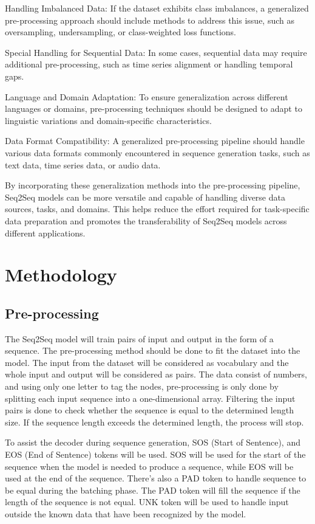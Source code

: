 \documentclass[conference]{IEEEtran}
\begin{document}
    Handling Imbalanced Data: If the dataset exhibits class imbalances, a generalized pre-processing approach should include methods to address this issue, such as oversampling, undersampling, or class-weighted loss functions.

    Special Handling for Sequential Data: In some cases, sequential data may require additional pre-processing, such as time series alignment or handling temporal gaps.

    Language and Domain Adaptation: To ensure generalization across different languages or domains, pre-processing techniques should be designed to adapt to linguistic variations and domain-specific characteristics.

    Data Format Compatibility: A generalized pre-processing pipeline should handle various data formats commonly encountered in sequence generation tasks, such as text data, time series data, or audio data.

By incorporating these generalization methods into the pre-processing pipeline, Seq2Seq models can be more versatile and capable of handling diverse data sources, tasks, and domains. This helps reduce the effort required for task-specific data preparation and promotes the transferability of Seq2Seq models across different applications.


\section{Methodology}

\subsection{Pre-processing}



The Seq2Seq model will train pairs of input and output in the form of a sequence. The pre-processing method should be done to fit the dataset into the model. The input from the dataset will be considered as vocabulary and the whole input and output will be considered as pairs. The data consist of numbers, and using only one letter to tag the nodes, pre-processing is only done by splitting each input sequence into a one-dimensional array. Filtering the input pairs is done to check whether the sequence is equal to the determined length size. If the sequence length exceeds the determined length, the process will stop.

To assist the decoder during sequence generation, SOS (Start of Sentence), and EOS (End of Sentence) tokens will be used. SOS will be used for the start of the sequence when the model is needed to produce a sequence, while EOS will be used at the end of the sequence. There's also a PAD token to handle sequence to be equal during the batching phase. The PAD token will fill the sequence if the length of the sequence is not equal. UNK token will be used to handle input outside the known data that have been recognized by the model.
\end{document}
